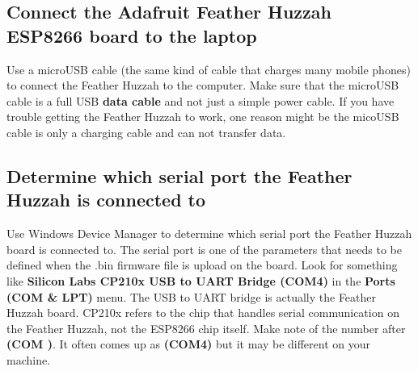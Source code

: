 \documentclass{book}
\begin{document}
    
        \subsection{Connect the Adafruit Feather Huzzah ESP8266 board to the
laptop}\label{connect-the-adafruit-feather-huzzah-esp8266-board-to-the-laptop}
    




    
        Use a microUSB cable (the same kind of cable that charges many mobile
phones) to connect the Feather Huzzah to the computer. Make sure that
the microUSB cable is a full USB \textbf{data cable} and not just a
simple power cable. If you have trouble getting the Feather Huzzah to
work, one reason might be the micoUSB cable is only a charging cable and
can not transfer data.
    




    
        \subsection{Determine which serial port the Feather Huzzah is connected
to}\label{determine-which-serial-port-the-feather-huzzah-is-connected-to}
    




    
        Use Windows Device Manager to determine which serial port the Feather
Huzzah board is connected to. The serial port is one of the parameters
that needs to be defined when the .bin firmware file is upload on the
board. Look for something like \textbf{Silicon Labs CP210x USB to UART
Bridge (COM4)} in the \textbf{Ports (COM \& LPT)} menu. The USB to UART
bridge is actually the Feather Huzzah board. CP210x refers to the chip
that handles serial communication on the Feather Huzzah, not the ESP8266
chip itself. Make note of the number after \textbf{(COM )}. It often
comes up as \textbf{(COM4)} but it may be different on your machine.
\end{document}
